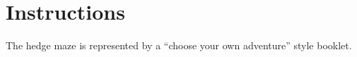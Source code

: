 \documentclass[green]{gl2018}
\begin{document}
\name{\gLabyrinth{}}
\newcommand{\areastart}[1]{ \begin{huge}{\bf \#{#1}} \end{huge} \\}
\newenvironment{fromhere}{\begin{center}\begin{itshape}}{\end{itshape}\end{center}}
\newenvironment{location}[1]{\begin{minipage}{\textwidth}\areastart{#1}\\}{\end{minipage}\vspace{1in}}
\section*{Instructions}
The hedge maze is represented by a ``choose your own adventure'' style booklet. 
\end{document}
